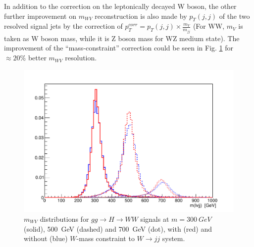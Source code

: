 \noindent
In addition to the correction on the leptonically decayed W boson, the other further improvement on $m_{WV}$ reconstruction is also made by $p_{T}(j,j)$ of the two resolved signal jets by the correction of $p_{T}^{corr}=p_{T}(j,j)\times \frac{m_{V}}{m_{jj}}$ (For WW, $m_V$ is taken as W boson mass, while it is Z boson mass for WZ medium state). The improvement of the ``mass-constraint'' correction could be seen in Fig. \ref{Fig:WHadmassConst} for $\approx 20\%$ better $m_{WV}$ resolution. 
\begin{figure}[h]
	\centering
	\includegraphics[width=0.6\hsize]{Chapter3/lvjjmass_WmassConstraint}
	\caption{$m_{WV}$ distributions for $gg \rightarrow H \rightarrow WW$ signals at $m=300~GeV$ (solid), 500~GeV (dashed) and 700~GeV (dot), with (red) and without (blue) $W$-mass constraint to $W \rightarrow jj$ system.}\label{Fig:WHadmassConst}
\end{figure}
\noindent
